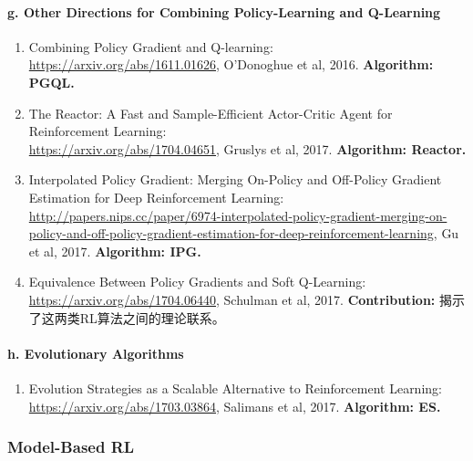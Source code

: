 \documentclass[lang=cn,11pt,a4paper]{eleganttemplate}
\begin{document}
\paragraph{g. Other Directions for Combining Policy-Learning and Q-Learning}
\begin{enumerate}
    \item Combining Policy Gradient and Q-learning:\\ \href{https://arxiv.org/abs/1611.01626}{https://arxiv.org/abs/1611.01626}, O’Donoghue et al, 2016. \textbf{Algorithm: PGQL.}
    \item The Reactor: A Fast and Sample-Efficient Actor-Critic Agent for Reinforcement Learning:\\ \href{https://arxiv.org/abs/1704.04651}{https://arxiv.org/abs/1704.04651}, Gruslys et al, 2017. \textbf{Algorithm: Reactor.}
    \item Interpolated Policy Gradient: Merging On-Policy and Off-Policy Gradient Estimation for Deep Reinforcement Learning:\\ \href{http://papers.nips.cc/paper/6974-interpolated-policy-gradient-merging-on-policy-and-off-policy-gradient-estimation-for-deep-reinforcement-learning}{http://papers.nips.cc/paper/6974-interpolated-policy-gradient-merging-on-policy-and-off-policy-gradient-estimation-for-deep-reinforcement-learning}, Gu et al, 2017. \textbf{Algorithm: IPG.}
    \item Equivalence Between Policy Gradients and Soft Q-Learning:\\ \href{https://arxiv.org/abs/1704.06440}{https://arxiv.org/abs/1704.06440}, Schulman et al, 2017. \textbf{Contribution:} 揭示了这两类RL算法之间的理论联系。
\end{enumerate}

\paragraph{h. Evolutionary Algorithms}
\begin{enumerate}
    \item Evolution Strategies as a Scalable Alternative to Reinforcement Learning:\\ \href{https://arxiv.org/abs/1703.03864}{https://arxiv.org/abs/1703.03864}, Salimans et al, 2017. \textbf{Algorithm: ES.}
\end{enumerate}

\subsubsection{Model-Based RL}
\end{document}
